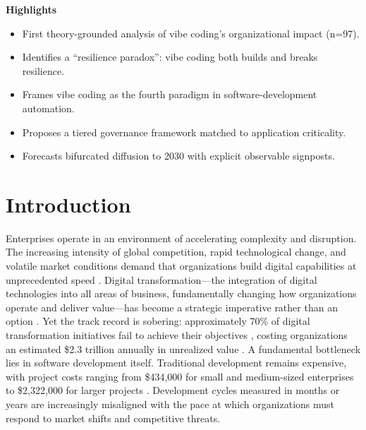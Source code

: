 \documentclass[preprint,12pt,authoryear]{elsarticle}
\begin{document}
\begin{center}
\begin{minipage}{0.95\textwidth}
\textbf{Highlights}
\begin{itemize}[leftmargin=2em, itemsep=2pt, topsep=2pt]
  \item First theory-grounded analysis of vibe coding's organizational impact (n=97).
  \item Identifies a ``resilience paradox'': vibe coding both builds and breaks resilience.
  \item Frames vibe coding as the fourth paradigm in software-development automation.
  \item Proposes a tiered governance framework matched to application criticality.
  \item Forecasts bifurcated diffusion to 2030 with explicit observable signposts.
\end{itemize}
\end{minipage}
\end{center}

\linenumbers

\section{Introduction}
\label{sec:introduction}

Enterprises operate in an environment of accelerating complexity and disruption. The increasing intensity of global competition, rapid technological change, and volatile market conditions demand that organizations build digital capabilities at unprecedented speed \citep{Sanchis2020, Sanchis2019}. Digital transformation---the integration of digital technologies into all areas of business, fundamentally changing how organizations operate and deliver value---has become a strategic imperative rather than an option \citep{Vial2019}. Yet the track record is sobering: approximately 70\% of digital transformation initiatives fail to achieve their objectives \citep{Tabrizi2019, Hess2016, Mergel2019}, costing organizations an estimated \$2.3 trillion annually in unrealized value \citep{Everest2024}. A fundamental bottleneck lies in software development itself. Traditional development remains expensive, with project costs ranging from \$434,000 for small and medium-sized enterprises to \$2,322,000 for larger projects \citep{Fryling2019, Clancy2014}. Development cycles measured in months or years are increasingly misaligned with the pace at which organizations must respond to market shifts and competitive threats.
\end{document}
